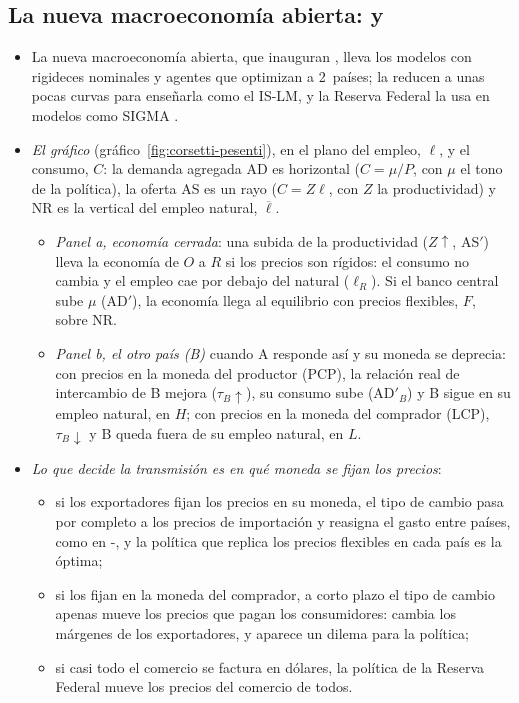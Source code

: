 \documentclass[11pt]{article}
\begin{document}
\subsection*{La nueva macroeconomía abierta:  y }
\begin{itemize}
\item La nueva macroeconomía abierta, que inauguran \textcite{ObstfeldRogoff1995Redux}, lleva los modelos con rigideces nominales y agentes que optimizan a 2~países; \textcite{CorsettiPesenti2009} la reducen a unas pocas curvas para enseñarla como el IS-LM, y la Reserva Federal la usa en modelos como SIGMA\nocite{ErcegGuerrieriGust2005} .
\item \emph{El gráfico} (gráfico~\ref{fig:corsetti-pesenti}), en el plano del empleo, $\ell$, y el consumo, $C$: la demanda agregada AD es horizontal ($C=\mu/P$, con $\mu$ el tono de la política), la oferta AS es un rayo ($C=Z\ell$, con $Z$ la productividad) y NR es la vertical del empleo natural, $\overline{\ell}$.
  \begin{itemize}
  \item \emph{Panel a, economía cerrada}: una subida de la productividad ($Z\uparrow$, AS$'$) lleva la economía de $O$ a $R$ si los precios son rígidos: el consumo no cambia y el empleo cae por debajo del natural ($\ell_R$). Si el banco central sube $\mu$ (AD$'$), la economía llega al equilibrio con precios flexibles, $F$, sobre NR.
  \item \emph{Panel b, el otro país (B)} cuando A responde así y su moneda se deprecia: con precios en la moneda del productor (PCP), la relación real de intercambio de B mejora ($\tau_B\uparrow$), su consumo sube (AD$'_B$) y B sigue en su empleo natural, en $H$; con precios en la moneda del comprador (LCP), $\tau_B\downarrow$ y B queda fuera de su empleo natural, en $L$.
  \end{itemize}
\item \emph{Lo que decide la transmisión es en qué moneda se fijan los precios}:
  \begin{itemize}
  \item si los exportadores fijan los precios en su moneda, el tipo de cambio pasa por completo a los precios de importación y reasigna el gasto entre países, como en -, y la política que replica los precios flexibles en cada país es la óptima;
  \item si los fijan en la moneda del comprador, a corto plazo el tipo de cambio apenas mueve los precios que pagan los consumidores: cambia los márgenes de los exportadores, y aparece un dilema para la política;
  \item si casi todo el comercio se factura en dólares, la política de la Reserva Federal mueve los precios del comercio de todos\nocite{Gopinath2020DCP}.
  \end{itemize}
\end{itemize}
\end{document}
